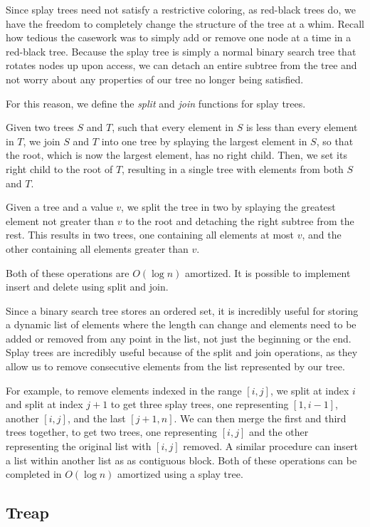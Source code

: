 \documentclass[11pt]{book}
\begin{document}
Since splay trees need not satisfy a restrictive coloring, as red-black trees do, we have the freedom to completely change the structure of the tree at a whim. Recall how tedious the casework was to simply add or remove one node at a time in a red-black tree. Because the splay tree is simply a normal binary search tree that rotates nodes up upon access, we can detach an entire subtree from the tree and not worry about any properties of our tree no longer being satisfied.

For this reason, we define the \textit{split} and \textit{join} functions for splay trees.

Given two trees $S$ and $T$, such that every element in $S$ is less than every element in $T$, we join $S$ and $T$ into one tree by splaying the largest element in $S$, so that the root, which is now the largest element, has no right child. Then, we set its right child to the root of $T$, resulting in a single tree with elements from both $S$ and $T$.

Given a tree and a value $v$, we split the tree in two by splaying the greatest element not greater than $v$ to the root and detaching the right subtree from the rest. This results in two trees, one containing all elements at most $v$, and the other containing all elements greater than $v$.

Both of these operations are $O(\log{n})$ amortized. It is possible to implement insert and delete using split and join.

Since a binary search tree stores an ordered set, it is incredibly useful for storing a dynamic list of elements where the length can change and elements need to be added or removed from any point in the list, not just the beginning or the end. Splay trees are incredibly useful because of the split and join operations, as they allow us to remove consecutive elements from the list represented by our tree.

For example, to remove elements indexed in the range $[i, j]$, we split at index $i$ and split at index $j+1$ to get three splay trees, one representing $[1, i-1]$, another $[i,j]$, and the last $[j+1,n]$. We can then merge the first and third trees together, to get two trees, one representing $[i,j]$ and the other representing the original list with $[i,j]$ removed. A similar procedure can insert a list within another list as as contiguous block. Both of these operations can be completed in $O(\log{n})$ amortized using a splay tree.

\subsection{Treap}
\end{document}
